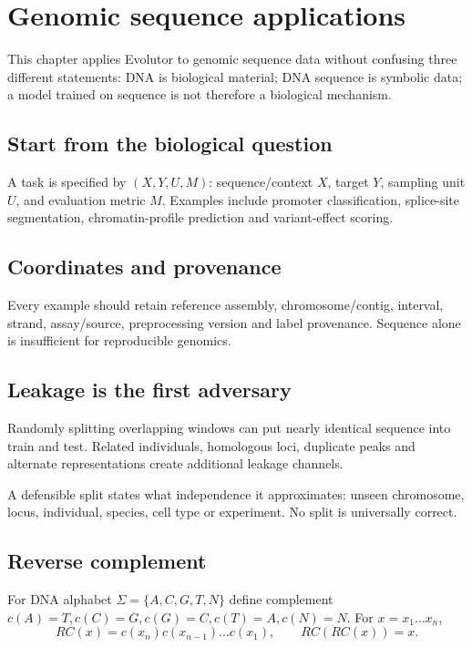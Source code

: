 \chapter{Genomic sequence applications}

This chapter applies Evolutor to genomic sequence data without confusing three different statements: DNA is biological material; DNA sequence is symbolic data; a model trained on sequence is not therefore a biological mechanism.

\section{Start from the biological question}
A task is specified by $(X,Y,U,M)$: sequence/context $X$, target $Y$, sampling unit $U$, and evaluation metric $M$. Examples include promoter classification, splice-site segmentation, chromatin-profile prediction and variant-effect scoring.

\section{Coordinates and provenance}
Every example should retain reference assembly, chromosome/contig, interval, strand, assay/source, preprocessing version and label provenance. Sequence alone is insufficient for reproducible genomics.

\section{Leakage is the first adversary}
Randomly splitting overlapping windows can put nearly identical sequence into train and test. Related individuals, homologous loci, duplicate peaks and alternate representations create additional leakage channels.

A defensible split states what independence it approximates: unseen chromosome, locus, individual, species, cell type or experiment. No split is universally correct.

\section{Reverse complement}
For DNA alphabet $\Sigma=\{A,C,G,T,N\}$ define complement $c(A)=T,c(C)=G,c(G)=C,c(T)=A,c(N)=N$. For $x=x_1\ldots x_n$,
\[
RC(x)=c(x_n)c(x_{n-1})\ldots c(x_1),\qquad RC(RC(x))=x.
\]

